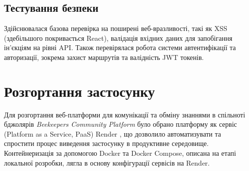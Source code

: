 \subsection{Тестування безпеки}
Здійснювалася базова перевірка на поширені веб-вразливості, такі як XSS (здебільшого покривається React), валідація вхідних даних для запобігання ін'єкціям на рівні API. Також перевірялася робота системи автентифікації та авторизації, зокрема захист маршрутів та валідність JWT токенів.

\section{Розгортання застосунку}
\label{sec:deployment}
Для розгортання веб-платформи для комунікації та обміну знаннями в спільноті бджолярів \textit{Beekeepers Community Platform} було обрано платформу як сервіс (Platform as a Service, PaaS) Render \cite{renderpaas}, що дозволило автоматизувати та спростити процес виведення застосунку в продуктивне середовище. Контейнеризація за допомогою Docker \cite{docker} та Docker Compose, описана на етапі локальної розробки, лягла в основу конфігурації сервісів на Render.

